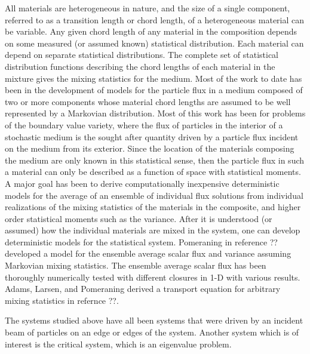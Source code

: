 \noindent
	\indent All materials are heterogeneous in nature, and the size of a single component, 
	referred to as a transition length or chord length, of a heterogeneous material can be
	variable.  Any given chord length of any material in the composition depends on some
	measured (or assumed known) statistical distribution.  Each material can depend on
	separate statistical distributions.  The complete set of statistical distribution functions
	describing the chord lengths of each material in the mixture gives the mixing statistics for
	the medium.  Most of the work to date has been in the development of models for the particle
	flux in a medium composed of two or more components whose material chord lengths are
	assumed to be well represented by a Markovian distribution.  Most of this work has been for
	problems of the boundary value variety, where the flux of particles in the interior of a
	stochastic medium is the sought after quantity driven by a particle flux incident on the medium
	from its exterior.  Since the location of the materials composing the medium are only known in
	this statistical sense, then the particle flux in such a material can only be described as a
	function of space with statistical moments.  A major goal has been to derive computationally
	inexpensive deterministic models for the average of an ensemble of individual flux solutions
	from individual realizations of the mixing statistics of the materials in the composite, and higher
	order statistical moments such as the variance.  After it is understood (or assumed) how the
	individual materials are mixed in the system, one can develop deterministic models for the
	statistical system.  Pomeraning in reference ?? developed a model for the ensemble average
	scalar flux and variance assuming Markovian mixing statistics.  The ensemble average scalar
	flux has been thoroughly numerically tested with different closures in 1-D with various results.
	Adams, Larsen, and Pomeraning derived a transport equation for arbitrary mixing statistics in
	refernce ??.

	The systems studied above have all been systems that were driven by an incident beam 
	of particles on an edge or edges of the system.  Another system which is of interest is the 
	critical system, which is an eigenvalue problem.

	
	
	
	
	
	
	
	
